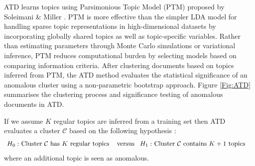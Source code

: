 ATD learns topics using  Parsimonious Topic Model (PTM) proposed by Soleimani \& Miller  \cite{PTM}. %
PTM is more effective than the simpler LDA model for handling sparse topic representations in high-dimensional datasets by  incorporating  globally shared topics as well as topic-specific variables.   
  Rather than estimating  parameters through  Monte Carlo simulations or variational inference,  PTM  reduces computational burden by selecting models based on comparing information criteria.     
After clustering documents based on  topics  inferred from PTM, the ATD method evaluates the statistical significance of an anomalous cluster using a non-parametric bootstrap approach.  Figure \ref{Fig:ATD} summarises the clustering process and significance testing of anomalous documents in ATD.  %
 
If we assume $K$ regular topics are inferred from a training set then ATD evaluates a cluster $\mathcal{C}$ based on the following hypothesis :
\begin{align}
&\mbox{ $H_0:$ Cluster $\mathcal{C}$ has $K$  regular topics } %
 \mbox{ \, versus \, $H_1:$ Cluster $\mathcal{C}$ contains  $K+1$ topics }
\label{Hyp:ATD} 
\end{align}
where an additional topic is seen as anomalous. 

